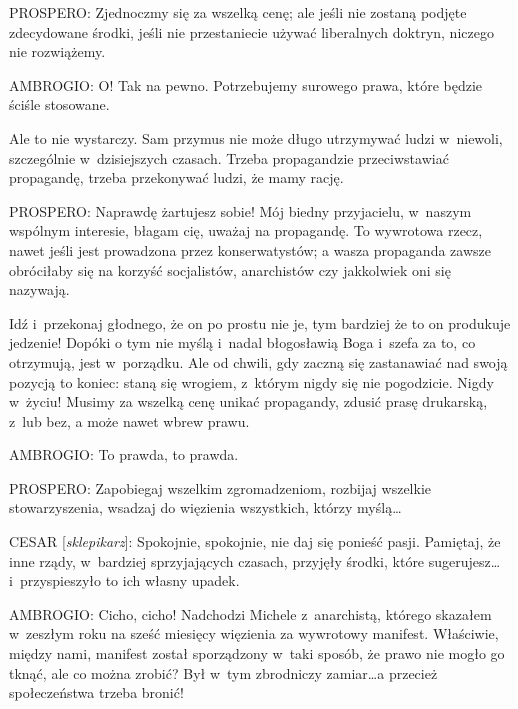 \documentclass[oneside,polish,11pt,sfheadings]{mwbk}
\begin{document}
 
\noindent PROSPERO: Zjednoczmy się za wszelką cenę; ale jeśli nie zostaną podjęte zdecydowane środki, jeśli nie przestaniecie
używać liberalnych doktryn, niczego nie rozwiążemy. 




 
\noindent AMBROGIO: O! Tak na pewno. Potrzebujemy surowego prawa, które będzie ściśle stosowane. 

 
Ale to nie wystarczy. Sam przymus nie może długo utrzymywać ludzi w~niewoli, szczególnie w~dzisiejszych czasach. Trzeba
propagandzie przeciwstawiać propagandę, trzeba przekonywać ludzi, że mamy rację. 




 
\noindent PROSPERO: Naprawdę żartujesz sobie! Mój biedny przyjacielu, w~naszym wspólnym interesie, błagam cię, uważaj na
propagandę. To wywrotowa rzecz, nawet jeśli jest prowadzona przez konserwatystów; a wasza propaganda zawsze obróciłaby
się na korzyść socjalistów, anarchistów czy jakkolwiek oni się nazywają. 

 
Idź i~przekonaj głodnego, że on po prostu nie je, tym bardziej że to on produkuje jedzenie! Dopóki o tym nie myślą i~nadal błogosławią Boga i~szefa za to, co otrzymują, jest w~porządku. Ale od chwili, gdy zaczną się zastanawiać nad
swoją pozycją to koniec: staną się wrogiem, z~którym nigdy się nie pogodzicie. Nigdy w~życiu! Musimy za wszelką cenę
unikać propagandy, zdusić prasę drukarską, z~lub bez, a może nawet wbrew prawu. 




 
\noindent AMBROGIO: To prawda, to prawda. 




 
\noindent PROSPERO: Zapobiegaj wszelkim zgromadzeniom, rozbijaj wszelkie stowarzyszenia, wsadzaj do więzienia wszystkich, którzy
myślą\ldots 




 
CESAR [\textit{sklepikarz}]: Spokojnie, spokojnie, nie daj się ponieść pasji. Pamiętaj, że inne rządy, w~bardziej
sprzyjających czasach, przyjęły środki, które sugerujesz\ldots i~przyspieszyło to ich własny upadek. 




 
\noindent AMBROGIO: Cicho, cicho! Nadchodzi Michele z~anarchistą, którego skazałem w~zeszłym roku na sześć miesięcy więzienia za
wywrotowy manifest. Właściwie, między nami, manifest został sporządzony w~taki sposób, że prawo nie mogło go tknąć, ale
co można zrobić? Był w~tym zbrodniczy zamiar\ldots a przecież społeczeństwa trzeba bronić! 
\end{document}
